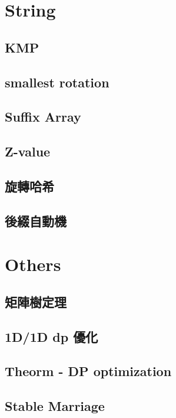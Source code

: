 \section{String}

\subsection{KMP}

\subsection{smallest rotation}

\subsection{Suffix Array}

\subsection{Z-value}

\subsection{旋轉哈希}

\subsection{後綴自動機}


\section{Others}

\subsection{矩陣樹定理}

\subsection{1D/1D dp 優化}

\subsection{Theorm - DP optimization}

\subsection{Stable Marriage}

